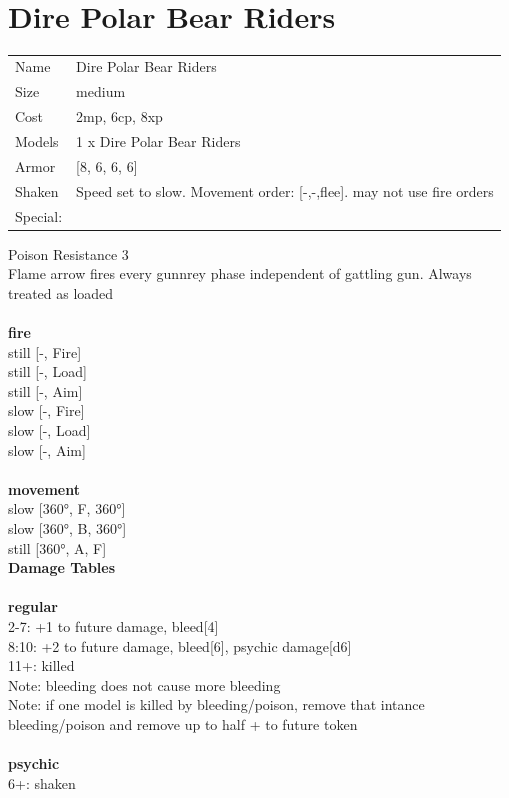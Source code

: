  
\ \\













\clearpage

\section{ Dire Polar Bear Riders }

\begin{tabular}{ll}
  Name & Dire Polar Bear Riders \\
  Size & medium\\
  Cost & 2mp, 6cp, 8xp\\
  Models & 1 x Dire Polar Bear Riders\\
  Armor & [8, 6, 6, 6]\\
  Shaken & Speed set to slow. Movement order: [-,-,flee]. may not use fire orders\\
  Special: \\
\end{tabular}

\noindent Poison Resistance 3\\ 
Flame arrow fires every gunnrey phase independent of gattling gun. Always treated as loaded\\ 


\ \\ {\bf fire } \\
still [-, Fire] \\
still [-, Load] \\
still [-, Aim] \\
slow [-, Fire] \\
slow [-, Load] \\
slow [-, Aim] \\
\ \\ {\bf movement } \\
slow [360°, F, 360°] \\
slow [360°, B, 360°] \\
still [360°, A, F] \\


{\bf Damage Tables} \\
\ \\ {\bf regular } \\
2-7: +1 to future damage, bleed[4] \\
8:10: +2 to future damage, bleed[6], psychic damage[d6] \\
11+: killed \\
Note: bleeding does not cause more bleeding \\
Note: if one model is killed by bleeding/poison, remove that intance \\ bleeding/poison and remove up to half + to future token \\
\ \\ {\bf psychic } \\
6+: shaken \\


